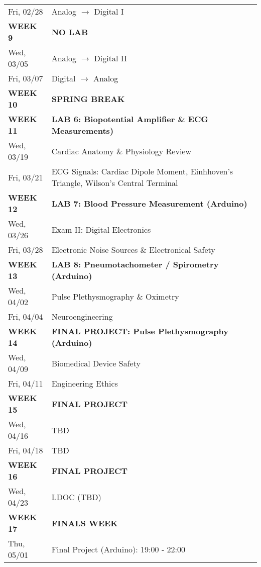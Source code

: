 \begin{tabular}{|l|l|}
Fri, 02/28  &   Analog $\rightarrow$ Digital I\\ 
{\bf WEEK 9}      &   {\bf NO LAB} \\
Wed, 03/05  &   Analog $\rightarrow$ Digital II\\ 
Fri, 03/07  &   Digital $\rightarrow$ Analog \\ 
{\bf WEEK 10}     &   {\bf SPRING BREAK} \\ \hline
{\bf WEEK 11}     &   {\bf LAB 6: Biopotential Amplifier \& ECG Measurements)} \\
Wed, 03/19  &   Cardiac Anatomy \& Physiology Review \\
Fri, 03/21  &   ECG Signals: Cardiac Dipole Moment, Einhhoven's Triangle, Wilson's Central Terminal\\ \hline
{\bf WEEK 12}     &   {\bf LAB 7: Blood Pressure Measurement (Arduino)} \\
Wed, 03/26  &   Exam II: Digital Electronics \\ 
Fri, 03/28  &   Electronic Noise Sources \& Electronical Safety\\  \hline
{\bf WEEK 13}     &   {\bf LAB 8: Pneumotachometer / Spirometry (Arduino)} \\
Wed, 04/02  &   Pulse Plethysmography \& Oximetry \\ \hline
Fri, 04/04  &   Neuroengineering\\ 
{\bf WEEK 14}     &   {\bf FINAL PROJECT: Pulse Plethysmography (Arduino)} \\
Wed, 04/09  &   Biomedical Device Safety\\
Fri, 04/11  &   Engineering Ethics\\ \hline
{\bf WEEK 15}     &   {\bf FINAL PROJECT} \\
Wed, 04/16  &   TBD \\
Fri, 04/18  &   TBD \\ \hline
{\bf WEEK 16}     &   {\bf FINAL PROJECT} \\
Wed, 04/23  &   LDOC (TBD) \\ \hline
{\bf WEEK 17}     &   {\bf FINALS WEEK} \\
Thu, 05/01  &   Final Project (Arduino): 19:00 - 22:00 \\ \hline
\end{tabular}
